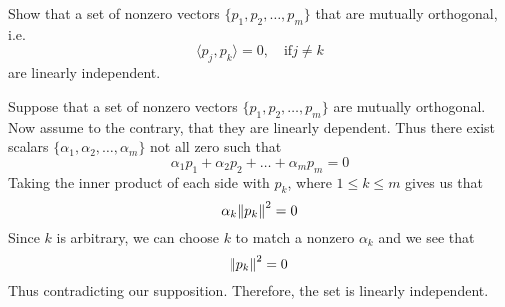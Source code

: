 \documentclass{homework}
\begin{document}
\begin{solution}
\end{solution}

\begin{problem}[2-49]
  Show that a set of nonzero vectors $\{p_1, p_2, \dots, p_m\}$ that are mutually orthogonal, i.e.
  \[ \langle p_j, p_k\rangle = 0, \quad \text{if} j\neq k\]
  are linearly independent.
\end{problem}

\begin{solution}
  Suppose that a set of nonzero vectors $\{p_1, p_2, \dots, p_m\}$ are mutually orthogonal. Now assume to the contrary, that they are linearly dependent. Thus there exist scalars $\{\alpha_1, \alpha_2, \dots, \alpha_m\}$ not all zero such that
  \[\alpha_1 p_1 + \alpha_2 p_2 + \dots + \alpha_m p_m = 0\]
  Taking the inner product of each side with $p_k$, where $1\leq k \leq m$ gives us that
  \[ \alpha_k \norm{p_k}^2 = 0\]
  Since $k$ is arbitrary, we can choose $k$ to match a nonzero $\alpha_k$ and we see that
  \[ \norm{p_k}^2 = 0\]
  Thus contradicting our supposition. Therefore, the set is linearly independent.
\end{solution}
\end{document}
